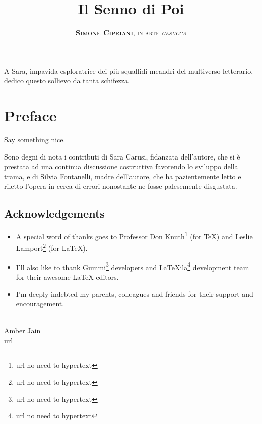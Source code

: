 \documentclass[11pt]{book}
\title{
	\Huge \textbf{Il Senno di Poi}
}
\author{
	\textsc{\textbf{Simone Cipriani}, in arte \textit{gesucca}}
}
\newenvironment{dedication} {
	\cleardoublepage\thispagestyle{empty}
	\vspace*{\stretch{1}}
	\hfill\begin{minipage}[t]{0.66\textwidth}
	\raggedright}
{
	\end{minipage}
	\vspace*{\stretch{3}}
	\clearpage
}
\begin{document}
\frontmatter
\maketitle
\begin{dedication}
	A Sara, impavida esploratrice dei più squallidi meandri del multiverso letterario, dedico questo sollievo da tanta schifezza.
\end{dedication}

\mainmatter\chapter*{Preface}

Say something nice.

Sono degni di nota i contributi di Sara Carusi, fidanzata dell'autore, che si è prestata ad una continua discussione costruttiva favorendo lo sviluppo della trama, e di Silvia Fontanelli, madre dell'autore, che ha pazientemente letto e riletto l'opera in cerca di errori nonostante ne fosse palesemente disgustata.

\section*{Acknowledgements}
\begin{itemize}
	\item A special word of thanks goes to Professor Don Knuth\footnote{url no need to hypertext} (for \TeX{}) and Leslie Lamport\footnote{url no need to hypertext} (for \LaTeX{}).
	\item I'll also like to thank Gummi\footnote{url no need to hypertext} developers and LaTeXila\footnote{url no need to hypertext} development team for their awesome \LaTeX{} editors.
	\item I'm deeply indebted my parents, colleagues and friends for their support and encouragement.
\end{itemize}
\mbox{} \\
\noindent Amber Jain \\
\noindent url










\end{document}

